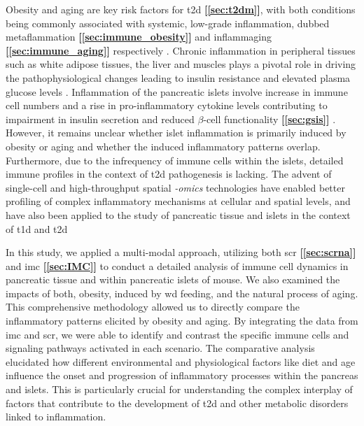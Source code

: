 Obesity and aging are key risk factors for \gls{t2d} \textbf{[\autoref{sec:t2dm}]}, with both conditions being commonly associated with systemic, low-grade inflammation, dubbed metaflammation \textbf{[\autoref{sec:immune_obesity}]} and inflammaging \textbf{[\autoref{sec:immune_aging}]} respectively \textbf{\cite{schulze_dietary_2005,donath_inflammation_2013,prattichizzo_inflammageing_2018,lee_integrated_2018,ying_role_2019}}. Chronic inflammation in peripheral tissues such as white adipose tissues, the liver and muscles plays a pivotal role in driving the pathophysiological changes leading to insulin resistance and elevated plasma glucose levels \textbf{\cite{gregor_inflammatory_2011,hotamisligil_inflammation_2017}}. Inflammation of the pancreatic islets involve increase in immune cell numbers and a rise in pro-inflammatory cytokine levels contributing to impairment in insulin secretion and reduced $\beta$-cell functionality \textbf{[\autoref{sec:gsis}]} \textbf{\cite{ehses_increased_2007,boni-schnetzler_increased_2008,boni-schnetzler_islet_2019}}. However, it remains unclear whether islet inflammation is primarily induced by obesity or aging and whether the induced inflammatory patterns overlap. Furthermore, due to the infrequency of immune cells within the islets, detailed immune profiles in the context of \gls{t2d} pathogenesis is lacking. The advent of single-cell and high-throughput spatial \textit{-omics} technologies have enabled better profiling of complex inflammatory mechanisms at cellular and spatial levels, and have also been applied to the study of pancreatic tissue and islets in the context of \gls{t1d} \textbf{\cite{ damond_map_2019, wang_multiplexed_2019,chiou_interpreting_2021}} and \gls{t2d} \textbf{\cite{wang_integrating_2023,weng_single_2023}}\\

\par  In this study, we applied a multi-modal approach, utilizing both \acrfull{scr} \textbf{[\autoref{sec:scrna}]} and \acrfull{imc} \textbf{[\autoref{sec:IMC}]} to conduct a detailed analysis of immune cell dynamics in pancreatic tissue and within pancreatic islets of mouse. We also examined the impacts of both, obesity, induced by \gls{wd} feeding, and the natural process of aging. This comprehensive methodology allowed us to directly compare the inflammatory patterns elicited by obesity and aging. By integrating the data from \gls{imc} and \gls{scr}, we were able to identify and contrast the specific immune cells and signaling pathways activated in each scenario. The comparative analysis elucidated how different environmental and physiological factors like diet and age influence the onset and progression of inflammatory processes within the pancreas and islets. This is particularly crucial for understanding the complex interplay of factors that contribute to the development of \gls{t2d} and other metabolic disorders linked to inflammation.

